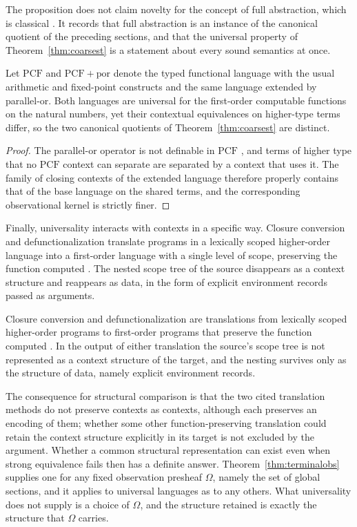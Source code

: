 The proposition does not claim novelty for the concept of full abstraction, which is classical \cite{plotkin}. It records that full abstraction is an instance of the canonical quotient of the preceding sections, and that the universal property of Theorem~\ref{thm:coarsest} is a statement about every sound semantics at once.

\begin{proposition}\label{prop:univinsufficient}
Let $\mathrm{PCF}$ and $\mathrm{PCF}+\mathrm{por}$ denote the typed functional language with the usual arithmetic and fixed-point constructs and the same language extended by parallel-or. Both languages are universal for the first-order computable functions on the natural numbers, yet their contextual equivalences on higher-type terms differ, so the two canonical quotients of Theorem~\ref{thm:coarsest} are distinct.
\end{proposition}
\begin{proof}
The parallel-or operator is not definable in $\mathrm{PCF}$ \cite{plotkin}, and terms of higher type that no $\mathrm{PCF}$ context can separate are separated by a context that uses it. The family of closing contexts of the extended language therefore properly contains that of the base language on the shared terms, and the corresponding observational kernel is strictly finer.
\end{proof}

Finally, universality interacts with contexts in a specific way. Closure conversion and defunctionalization translate programs in a lexically scoped higher-order language into a first-order language with a single level of scope, preserving the function computed \cite{reynolds,minamide}. The nested scope tree of the source disappears as a context structure and reappears as data, in the form of explicit environment records passed as arguments.

\begin{proposition}\label{prop:reify}
Closure conversion and defunctionalization are translations from lexically scoped higher-order programs to first-order programs that preserve the function computed \cite{reynolds,minamide}. In the output of either translation the source's scope tree is not represented as a context structure of the target, and the nesting survives only as the structure of data, namely explicit environment records.
\end{proposition}

The consequence for structural comparison is that the two cited translation methods do not preserve contexts as contexts, although each preserves an encoding of them; whether some other function-preserving translation could retain the context structure explicitly in its target is not excluded by the argument. Whether a common structural representation can exist even when strong equivalence fails then has a definite answer. Theorem~\ref{thm:terminalobs} supplies one for any fixed observation presheaf $\Omega$, namely the set of global sections, and it applies to universal languages as to any others. What universality does not supply is a choice of $\Omega$, and the structure retained is exactly the structure that $\Omega$ carries.
